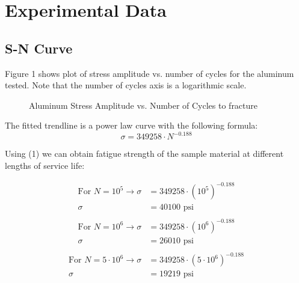 \documentclass{article}
\begin{document}
\section{Experimental Data}
\subsection{S-N Curve}
Figure 1 shows plot of stress amplitude vs. number of cycles for the aluminum tested. Note that the number of cycles axis is a logarithmic scale.
\begin{figure}[H]
\begin{center}
    \caption{Aluminum Stress Amplitude vs. Number of Cycles to fracture}
    \label{tab:graph1}
\end{center}
\end{figure}

The fitted trendline is a power law curve with the following formula:
\begin{equation}
\sigma = 349258\cdot N^{-0.188}
\end{equation}

Using (1) we can obtain fatigue strength of the sample material at different lengths of service life:

\vspace{1em}
\begin{align*}
\textrm{For } N = 10^5 \rightarrow \sigma &=  349258\cdot (10^5)^{-0.188} \\
						 \sigma &= 40100 \textrm{ psi}\\
\end{align*}						 
\begin{align*}
\textrm{For } N = 10^6 \rightarrow \sigma &=  349258\cdot (10^6)^{-0.188} \\
						 \sigma &= 26010 \textrm{ psi}\\						
\end{align*}						 
\begin{align*}						 
\textrm{For } N = 5\cdot 10^6 \rightarrow \sigma &=  349258\cdot (5\cdot 10^6)^{-0.188} \\
						 \sigma &= 19219 \textrm{ psi}\\
\end{align*}
\end{document}

